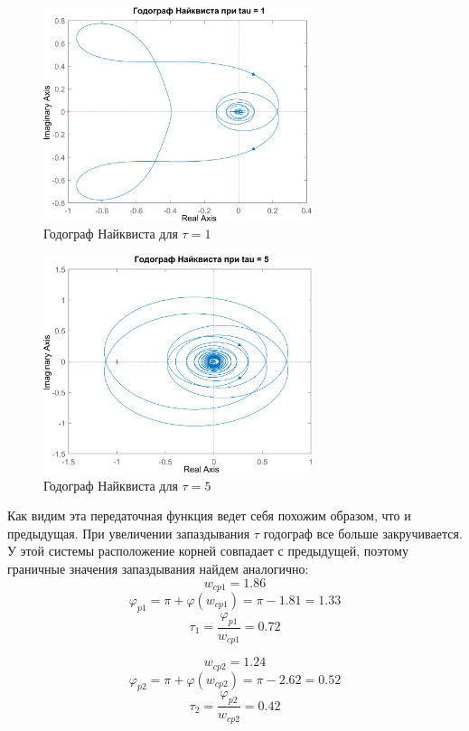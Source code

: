 \begin{figure}[H]
    \centering
    \centering
    \includegraphics[width=0.7\textwidth, trim={0cm 0cm 0cm 0cm}]{../images/3_2_3_hod.png}
    \caption{Годограф Найквиста для $\tau = 1$}
\end{figure}

\begin{figure}[H]
    \centering
    \centering
    \includegraphics[width=0.7\textwidth, trim={0cm 0cm 0cm 0cm}]{../images/3_2_4_hod.png}
    \caption{Годограф Найквиста для $\tau = 5$}
\end{figure}

Как видим эта передаточная функция ведет себя похожим образом, что и предыдущая. При увеличении запаздывания $\tau$ годограф все 
больше закручивается. У этой системы расположение корней совпадает с предыдущей, поэтому граничные значения запаздывания найдем
аналогично:
\[
w_{cp1} = 1.86
\]
\[
\varphi_{p1} = \pi + \varphi(w_{cp1}) = \pi - 1.81 = 1.33
\]
\[
\tau_1 = \frac{\varphi_{p1}}{w_{cp1}} = 0.72
\]


\[
w_{cp2} = 1.24
\]
\[
\varphi_{p2} = \pi + \varphi(w_{cp2}) = \pi - 2.62 = 0.52
\]
\[
\tau_2 = \frac{\varphi_{p2}}{w_{cp2}} = 0.42
\]

